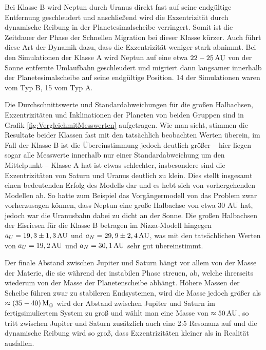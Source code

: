 \documentclass[12pt,a4paper,twoside]{article}
\renewcommand{\cite}{\citep}
\newcommand{\ME}{M_\oplus}
\begin{document}
Bei Klasse B wird Neptun durch Uranus direkt fast auf seine endgültige Entfernung geschleudert %
und anschließend wird die Exzentrizität durch dynamische Reibung in der Planetesimalscheibe verringert\cite{Nesvorny2007}. Somit ist die Zeitdauer der Phase der Schnellen Migration bei dieser Klasse kürzer\cite{Tsiganis2005}. Auch führt diese Art der Dynamik dazu, dass die Exzentrizität weniger stark abnimmt\cite{Tsiganis2005}.
Bei den Simulationen der Klasse A wird Neptun auf eine etwa $\unit[22-25]{AU}$ von der Sonne entfernte Umlaufbahn geschleudert und migriert dann langsamer innerhalb der Planetesimalscheibe auf seine endgültige Position\cite{Tsiganis2005}.
14 der Simulationen waren vom Typ B, 15 vom Typ A. %

Die Durchschnittswerte und Standardabweichungen für die großen Halbachsen, Exzentrizitäten und Inklinationen der Planeten von beiden Gruppen sind in Grafik \ref{fig:VergleichmitMesswerten} aufgetragen. Wie man sieht, stimmen die Resultate beider Klassen fast mit den tatsächlich beobachten Werten überein, im Fall der Klasse B ist die Übereinstimmung jedoch deutlich größer – hier liegen sogar alle Messwerte innerhalb nur einer Standardabweichung um den Mittelpunkt\cite{Tsiganis2005} – Klasse A hat ist etwas schlechter, insbesondere sind die Exzentrizitäten von Saturn und Uranus deutlich zu klein\cite{Tsiganis2005,Nesvorny2007}. 
Dies stellt insgesamt einen bedeutenden Erfolg des Modells dar und es hebt sich von vorhergehenden Modellen ab.
So hatte zum Beispiel das Vorgängermodell von \cite{Gomes2004} %
das Problem zwar vorherzusagen können, dass Neptun eine große Halbachse von etwa 30 AU hat, jedoch war die Uranusbahn dabei zu dicht an der Sonne.
Die großen Halbachsen der Eisriesen für die Klasse B betragen im Nizza-Modell hingegen $a_U = \unit[19,3 \pm 1,3]{AU}$ und $a_N = \unit[29,9 \pm 2,4]{AU}$, was mit den tatsächlichen Werten von $a_U = \unit[19,2]{AU}$ und $a_N = \unit[30,1]{AU}$ sehr gut übereinstimmt\cite{Tsiganis2005}.

Der finale Abstand zwischen Jupiter und Saturn hängt vor allem von der Masse der Materie, %
die sie während der instabilen Phase streuen, ab, welche ihrerseits wiederum von der Masse der Planetenscheibe abhängt\cite{Tsiganis2005}. %
Höhere Massen der Scheibe führen zwar zu stabileren Endsystemen, wird die Masse jedoch größer als $\approx \unit[(35-40)]{\ME}$ wird der Abstand zwischen Jupiter und Saturn im fertigsimuliertem System zu groß\cite{Tsiganis2005} und wählt man eine Masse von $\approx \unit[50]{AU}$, so tritt zwischen Jupiter und Saturn zusätzlich auch eine 2:5 Resonanz auf und die dynamische Reibung wird so groß, dass Exzentrizitäten kleiner als in Realität ausfallen\cite{Tsiganis2005}.
\end{document}
